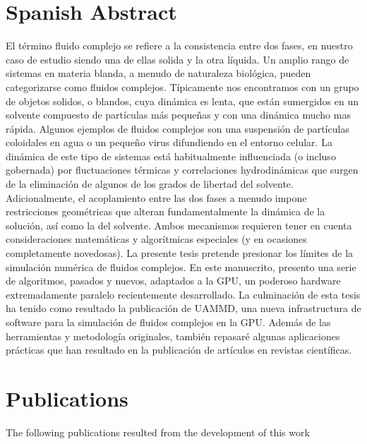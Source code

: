 \documentclass[ twoside,openright,titlepage,numbers=noenddot,%
headinclude,footinclude,cleardoublepage=empty,abstract=on,
BCOR=5mm,paper=a4,fontsize=11pt, dvipsnames
]{scrreprt}
\begin{document}
\cleardoublepage
\newpage

\chapter*{Spanish Abstract}
El término fluido complejo se refiere a la consistencia entre dos fases, en nuestro caso de estudio siendo una de ellas solida y la otra líquida. Un amplio rango de sistemas en materia blanda, a menudo de naturaleza biológica, pueden categorizarse como fluidos complejos. Típicamente nos encontramos con un grupo de objetos solidos, o blandos, cuya dinámica es lenta, que están sumergidos en un solvente compuesto de partículas más pequeñas y con una dinámica mucho mas rápida. Algunos ejemplos de fluidos complejos son una suspensión de partículas coloidales en agua o un pequeño virus difundiendo en el entorno celular.
La dinámica de este tipo de sistemas está habitualmente influenciada (o incluso gobernada) por fluctuaciones térmicas y correlaciones hydrodinámicas que surgen de la eliminación de algunos de los grados de libertad del solvente.
Adicionalmente, el acoplamiento entre las dos fases a menudo impone restricciones geométricas que alteran fundamentalmente la dinámica de la solución, así como la del solvente. Ambos mecanismos requieren tener en cuenta consideraciones matemáticas y algorítmicas especiales (y en ocasiones completamente novedosas).
La presente tesis pretende presionar los límites de la simulación numérica de fluidos complejos. En este manuscrito, presento una serie de algoritmos, pasados y nuevos, adaptados a la GPU, un poderoso hardware extremadamente paralelo recientemente desarrollado. La culminación de esta tesis ha tenido como resultado la publicación de UAMMD, una nueva infrastructura de software para la simulación de fluidos complejos en la GPU. Además de las herramientas y metodología originales, también repasaré algunas aplicaciones prácticas que han resultado en la publicación de artículos en revistas científicas.

\cleardoublepage
\newpage
{}
\chapter*{Publications}

The following publications resulted from the development of this work
\end{document}
